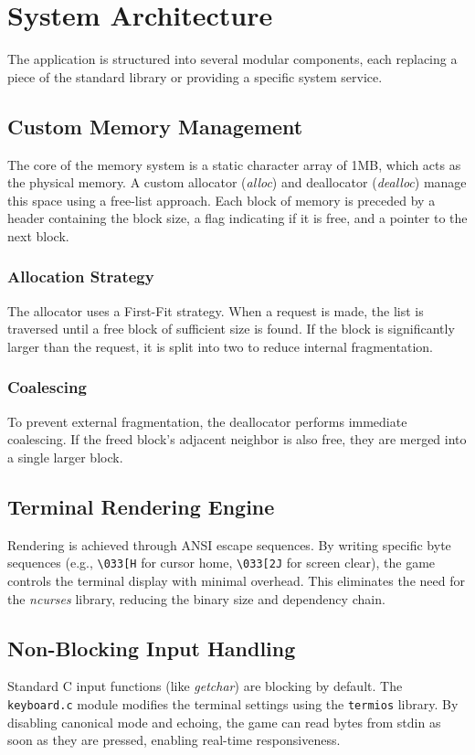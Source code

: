 \documentclass[conference]{IEEEtran}
\begin{document}
\section{System Architecture}
The application is structured into several modular components, each replacing a piece of the standard library or providing a specific system service.

\subsection{Custom Memory Management}
The core of the memory system is a static character array of 1MB, which acts as the physical memory. A custom allocator (\textit{alloc}) and deallocator (\textit{dealloc}) manage this space using a free-list approach. Each block of memory is preceded by a header containing the block size, a flag indicating if it is free, and a pointer to the next block.

\subsubsection{Allocation Strategy}
The allocator uses a First-Fit strategy. When a request is made, the list is traversed until a free block of sufficient size is found. If the block is significantly larger than the request, it is split into two to reduce internal fragmentation.

\subsubsection{Coalescing}
To prevent external fragmentation, the deallocator performs immediate coalescing. If the freed block's adjacent neighbor is also free, they are merged into a single larger block.

\subsection{Terminal Rendering Engine}
Rendering is achieved through ANSI escape sequences. By writing specific byte sequences (e.g., \texttt{\textbackslash 033[H} for cursor home, \texttt{\textbackslash 033[2J} for screen clear), the game controls the terminal display with minimal overhead. This eliminates the need for the \textit{ncurses} library, reducing the binary size and dependency chain.

\subsection{Non-Blocking Input Handling}
Standard C input functions (like \textit{getchar}) are blocking by default. The \texttt{keyboard.c} module modifies the terminal settings using the \texttt{termios} library. By disabling canonical mode and echoing, the game can read bytes from stdin as soon as they are pressed, enabling real-time responsiveness.
\end{document}
